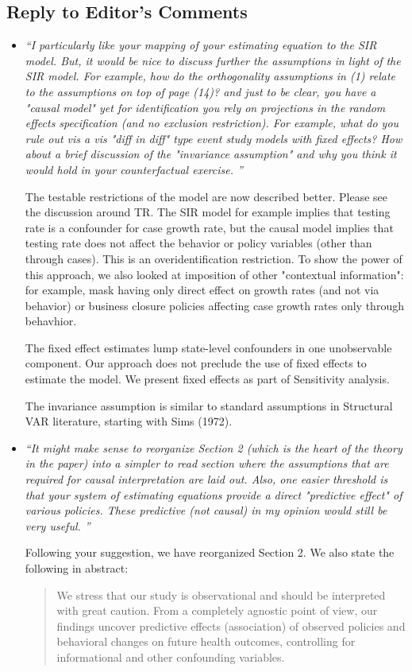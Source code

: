 \documentclass[11pt]{article}
\begin{document}
\subsection*{Reply to Editor's Comments}
\begin{itemize}

\item   \textit{``I particularly like your mapping of your estimating equation to the SIR model. But, it would be nice to discuss further the assumptions in light of the SIR model. For example, how do the orthogonality assumptions in (1) relate to the assumptions on top of page (14)? and just to be clear, you have a "causal model" yet for identification you rely on projections in the random effects specification (and no exclusion restriction). For example, what do you rule out vis a vis "diff in diff" type event study models with fixed effects? How about a brief discussion of the "invariance assumption" and why you think it would hold in your counterfactual exercise. ''}

The testable restrictions of the model are now described better.  Please see the discussion around TR. The SIR model
for example implies that testing rate is a confounder for case growth rate, but the causal model implies  that testing rate
does not affect the behavior or policy variables (other than through cases). This is an overidentification restriction.
To show the power of this approach, we also looked at imposition of other "contextual information": for example, mask
having only direct effect on growth rates (and not via behavior) or business closure policies affecting case growth rates
only through behavhior.

The fixed effect estimates lump state-level confounders in one unobservable component.  Our approach does not preclude
the use of fixed effects to estimate the model. We present fixed effects as part of Sensitivity analysis.

The invariance assumption is similar to standard assumptions in Structural VAR literature, starting with Sims (1972).
 

\item   \textit{``It might make sense to reorganize Section 2 (which is the heart of the theory in the paper) into a simpler to read section  where the assumptions that are required for causal interpretation are laid out. Also, one easier threshold is that your system of estimating equations provide a direct "predictive effect" of various policies. These predictive (not causal) in my opinion would still be very useful. ''}

Following your suggestion, we have reorganized Section 2. 
 We also state the following in abstract:
 \begin{quote}
 We stress that our study is observational and should be interpreted with great caution. 
 From a completely agnostic point of view,
our findings uncover predictive effects (association) of observed policies and behavioral changes  on future health outcomes,
 controlling for informational and other confounding variables.
\end{quote}

\end{itemize}
\end{document}
